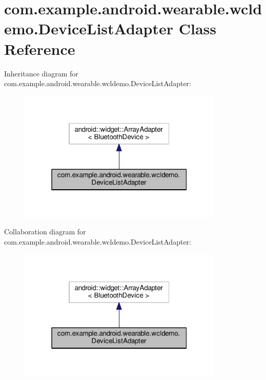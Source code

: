 \hypertarget{classcom_1_1example_1_1android_1_1wearable_1_1wcldemo_1_1DeviceListAdapter}{}\section{com.\+example.\+android.\+wearable.\+wcldemo.\+Device\+List\+Adapter Class Reference}
\label{classcom_1_1example_1_1android_1_1wearable_1_1wcldemo_1_1DeviceListAdapter}


Inheritance diagram for com.\+example.\+android.\+wearable.\+wcldemo.\+Device\+List\+Adapter\+:\nopagebreak
\begin{figure}[H]
\begin{center}
\leavevmode
\includegraphics[width=277pt]{da/daf/classcom_1_1example_1_1android_1_1wearable_1_1wcldemo_1_1DeviceListAdapter__inherit__graph}
\end{center}
\end{figure}


Collaboration diagram for com.\+example.\+android.\+wearable.\+wcldemo.\+Device\+List\+Adapter\+:\nopagebreak
\begin{figure}[H]
\begin{center}
\leavevmode
\includegraphics[width=277pt]{df/d0e/classcom_1_1example_1_1android_1_1wearable_1_1wcldemo_1_1DeviceListAdapter__coll__graph}
\end{center}
\end{figure}
